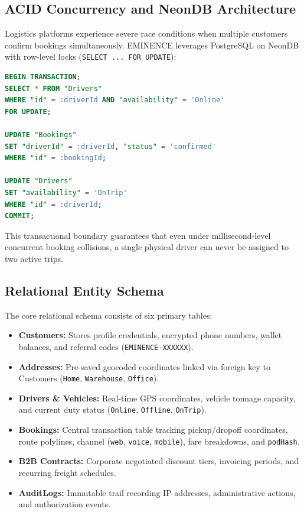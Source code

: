 \documentclass[conference]{IEEEtran}
\begin{document}
\subsection{ACID Concurrency and NeonDB Architecture}
Logistics platforms experience severe race conditions when multiple customers confirm bookings simultaneously. EMINENCE leverages PostgreSQL on NeonDB with row-level locks (\texttt{SELECT ... FOR UPDATE}):
\begin{lstlisting}[language=SQL, basicstyle=\small\ttfamily, breaklines=true]
BEGIN TRANSACTION;
SELECT * FROM "Drivers" 
WHERE "id" = :driverId AND "availability" = 'Online'
FOR UPDATE;

UPDATE "Bookings" 
SET "driverId" = :driverId, "status" = 'confirmed' 
WHERE "id" = :bookingId;

UPDATE "Drivers" 
SET "availability" = 'OnTrip' 
WHERE "id" = :driverId;
COMMIT;
\end{lstlisting}
This transactional boundary guarantees that even under millisecond-level concurrent booking collisions, a single physical driver can never be assigned to two active trips.

\subsection{Relational Entity Schema}
The core relational schema consists of six primary tables:
\begin{itemize}
    \item \textbf{Customers:} Stores profile credentials, encrypted phone numbers, wallet balances, and referral codes (\texttt{EMINENCE-XXXXXX}).
    \item \textbf{Addresses:} Pre-saved geocoded coordinates linked via foreign key to Customers (\texttt{Home}, \texttt{Warehouse}, \texttt{Office}).
    \item \textbf{Drivers \& Vehicles:} Real-time GPS coordinates, vehicle tonnage capacity, and current duty status (\texttt{Online}, \texttt{Offline}, \texttt{OnTrip}).
    \item \textbf{Bookings:} Central transaction table tracking pickup/dropoff coordinates, route polylines, channel (\texttt{web}, \texttt{voice}, \texttt{mobile}), fare breakdowns, and \texttt{podHash}.
    \item \textbf{B2B Contracts:} Corporate negotiated discount tiers, invoicing periods, and recurring freight schedules.
    \item \textbf{AuditLogs:} Immutable trail recording IP addresses, administrative actions, and authorization events.
\end{itemize}
\end{document}
